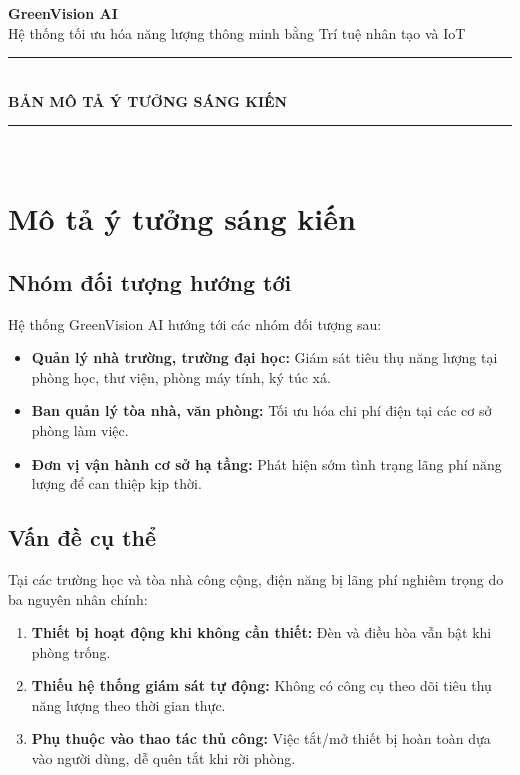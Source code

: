 \documentclass[12pt,a4paper]{article}
\begin{document}
\begin{center}
    {\LARGE\bfseries\color{darkgreen} GreenVision AI}\\[0.3cm]
    {\Large Hệ thống tối ưu hóa năng lượng thông minh bằng Trí tuệ nhân tạo và IoT}\\[1.5cm]
    \rule{\textwidth}{0.5pt}\\[0.3cm]
    {\large\bfseries BẢN MÔ TẢ Ý TƯỞNG SÁNG KIẾN}\\[0.3cm]
    \rule{\textwidth}{0.5pt}\\[2cm]
\end{center}

\section{Mô tả ý tưởng sáng kiến}

\subsection{Nhóm đối tượng hướng tới}

Hệ thống GreenVision AI hướng tới các nhóm đối tượng sau:

\begin{itemize}[leftmargin=1.5cm]
    \item \textbf{Quản lý nhà trường, trường đại học:} Giám sát tiêu thụ năng lượng tại phòng học, thư viện, phòng máy tính, ký túc xá.
    \item \textbf{Ban quản lý tòa nhà, văn phòng:} Tối ưu hóa chi phí điện tại các cơ sở phòng làm việc.
    \item \textbf{Đơn vị vận hành cơ sở hạ tầng:} Phát hiện sớm tình trạng lãng phí năng lượng để can thiệp kịp thời.
\end{itemize}

\subsection{Vấn đề cụ thể}

Tại các trường học và tòa nhà công cộng, điện năng bị lãng phí nghiêm trọng do ba nguyên nhân chính:

\begin{enumerate}[leftmargin=1.5cm]
    \item \textbf{Thiết bị hoạt động khi không cần thiết:} Đèn và điều hòa vẫn bật khi phòng trống.
    \item \textbf{Thiếu hệ thống giám sát tự động:} Không có công cụ theo dõi tiêu thụ năng lượng theo thời gian thực.
    \item \textbf{Phụ thuộc vào thao tác thủ công:} Việc tắt/mở thiết bị hoàn toàn dựa vào người dùng, dễ quên tắt khi rời phòng.
\end{enumerate}
\end{document}
